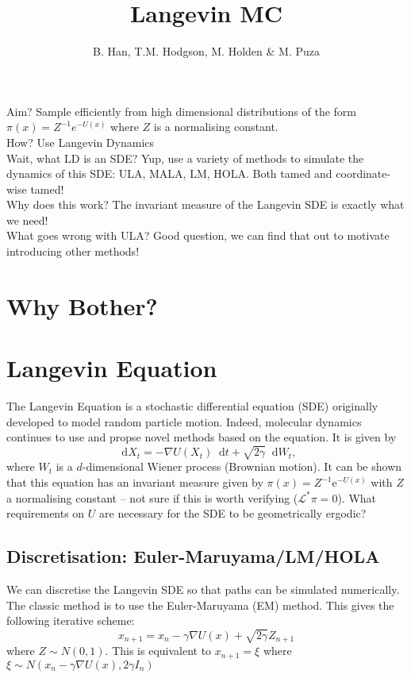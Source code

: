 \documentclass[a4paper]{article}
\title{Langevin MC}
\author{B. Han, T.M. Hodgson, M. Holden \& M. Puza}
\theoremstyle{definition}
\renewcommand{\L}{\mathcal{L}}
\newcommand{\e}{\mathrm{e}}
\newcommand{\dif}{\mathop{}\!\mathrm{d}}
\begin{document}
	\maketitle 
	
	Aim? Sample efficiently from high dimensional distributions of the form \(\pi(x) = Z^{-1} e^{-U(x)}\) where \(Z\) is a normalising constant.\\
	How? Use Langevin Dynamics\\
	Wait, what LD is an SDE? Yup, use a variety of methods to simulate the dynamics of this SDE: ULA, MALA, LM, HOLA. Both tamed and coordinate-wise tamed!\\
	Why does this work? The invariant measure of the Langevin SDE is exactly what we need!\\
	What goes wrong with ULA? Good question, we can find that out to motivate introducing other methods!\\
	\section{Why Bother?}
	\section{Langevin Equation}
	The Langevin Equation is a stochastic differential equation (SDE) originally developed to model random particle motion. Indeed, molecular dynamics continues to use and propse novel methods based on the equation. It is given by 	\[\dif X_t = -\nabla U(X_t)\dif t +\sqrt{2\gamma}\dif W_t,\]
	where \(W_t\) is a \(d\)-dimensional Wiener process (Brownian motion). It can be shown that this equation has an invariant measure given by \(\pi(x)=Z^{-1}\e^{-U(x)}\) with \(Z\) a normalising constant -- not sure if this is worth verifying (\(\L^*\pi=0 \)). What requirements on \(U\) are necessary for the SDE to be geometrically ergodic?
	
	
	
		\subsection{Discretisation: Euler-Maruyama/LM/HOLA}
		We can discretise the Langevin SDE so that paths can be simulated numerically. The classic method is to use the Euler-Maruyama (EM) method. This gives the following iterative scheme:
		\[x_{n+1}=x_n - \gamma \nabla U(x) +\sqrt{2\gamma}Z_{n+1} \]
		where \(Z \sim N(0,1)\). This is equivalent to 
		\(x_{n+1} = \xi\) where \(\xi \sim N\left(x_n-\gamma \nabla U(x), 2\gamma I_n\right)\)
		
\end{document}

